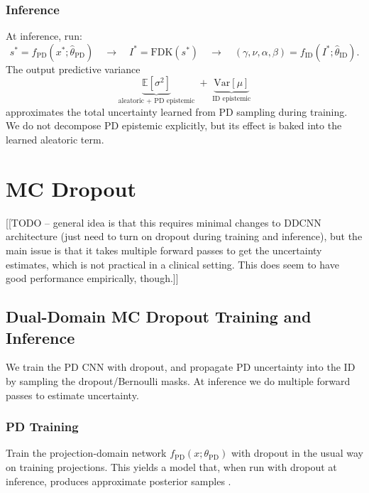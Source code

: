 \documentclass{article}
\newcommand{\0}{\varnothing}
\theoremstyle{definition}
\begin{document}
\begin{enumerate}[1.]
\end{enumerate}

\subsubsection{Inference}
At inference, run:
\[
  s^\ast = f_\text{PD}(x^\ast; \hat\theta_\text{PD}) \quad\to\quad I^\ast = \mathrm{FDK}(s^\ast) \quad\to\quad (\gamma,\nu,\alpha,\beta) = f_\text{ID}(I^\ast; \hat\theta_\text{ID}).
\]
The output predictive variance 
\[
  \underbrace{\mathbb{E}[\sigma^2]}_{\text{aleatoric + PD epistemic}} \;+\; \underbrace{\mathrm{Var}[\mu]}_{\text{ID epistemic}}
\]
approximates the total uncertainty learned from PD sampling during training. We do not decompose PD epistemic explicitly, but its effect is baked into the learned aleatoric term. 

\section{MC Dropout}

[[TODO -- general idea is that this requires minimal changes to DDCNN architecture (just need to turn on dropout during training and inference), but the main issue is that it takes multiple forward passes to get the uncertainty estimates, which is not practical in a clinical setting. This does seem to have good performance empirically, though.]]

\subsection{Dual-Domain MC Dropout Training and Inference}

We train the PD CNN with dropout, and propagate PD uncertainty into the ID by sampling the dropout/Bernoulli masks. At inference we do multiple forward passes to estimate uncertainty.

\subsubsection{PD Training}
Train the projection-domain network $f_\text{PD}(x;\theta_\text{PD})$ with dropout in the usual way on training projections. This yields a model that, when run with dropout at inference, produces approximate posterior samples \cite{gal2016dropoutbayesianapproximationrepresenting}.
\end{document}
